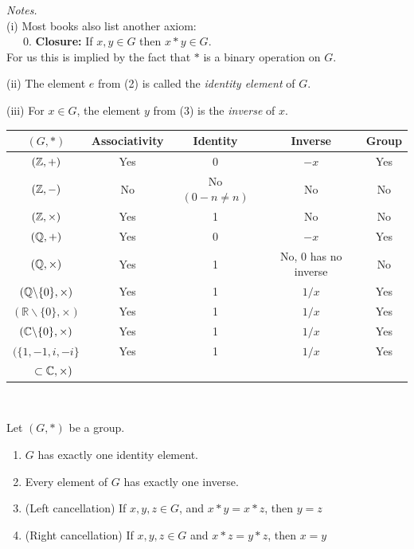 \documentclass[twoside]{scrartcl}
\begin{document}
\emph{Notes.}\\
 (i) Most books also list another axiom:\\ \vspace*{5pt}
~~~0. \textbf{Closure: }If $x,y \in G$ then $x * y \in G$.\\
For us this is implied by the fact that $*$ is a binary operation on $G$.

(ii) The element $e$ from (2) is called the \emph{identity element} of $G$.

(iii) For $x \in G$, the element $y$ from (3) is the \emph{inverse} of $x$.\\

\begin{examples}
{\renewcommand{\arraystretch}{1.3}
\begin{table}[H]
\centering
    \begin{tabular}{ccccc}
    \hline
    $(G, *)$ & Associativity & Identity & Inverse & Group \\ \hline
    $(\mathbb{Z},+)$ & Yes & $0$ & $-x$ & Yes \\
    $(\mathbb{Z},-) $  & No & No {\tiny $(0 -n \neq n)$} & No & No\\
    $(\mathbb{Z}, \times)$ & Yes & 1 & No & No \\
    $(\mathbb{Q}, +)$ & Yes & $0$ & $-x$ & Yes\\
    $(\mathbb{Q},\times)$ & Yes & 1 & No, {\tiny 0 has no inverse} & No\\
    $(\mathbb{Q}\backslash\{0\},\times)$ & Yes & 1 & $1/x$ & Yes\\ 
    $( \mathbb{R}\backslash\{0\},\times)$ & Yes & 1 & $1/x$ & Yes\\ 
    $(\mathbb{C} \backslash\{0\},\times)$ & Yes & 1 & $1/x$ & Yes\\ 
    $(\{1,-1,i,-i\}$ & Yes & 1 & $1/x$ & Yes\vspace*{-5pt}\\ 
   $ ~~~~\subset \mathbb{C}, \times)$ &  & & & 
    \end{tabular}
\end{table}
}
\end{examples}~

\begin{proposition} Let $(G,*)$ be a group. \begin{enumerate}
 \item $G$ has exactly one identity element.
 \item Every element of $G$ has exactly one inverse.
 \item (Left cancellation) If $x,y,z \in G$, and $x*y = x*z$, then $y = z$
 \item (Right cancellation) If $x,y,z \in G$ and $x*z = y*z$, then $x = y$
 \end{enumerate}
 \end{proposition}
\end{document}

